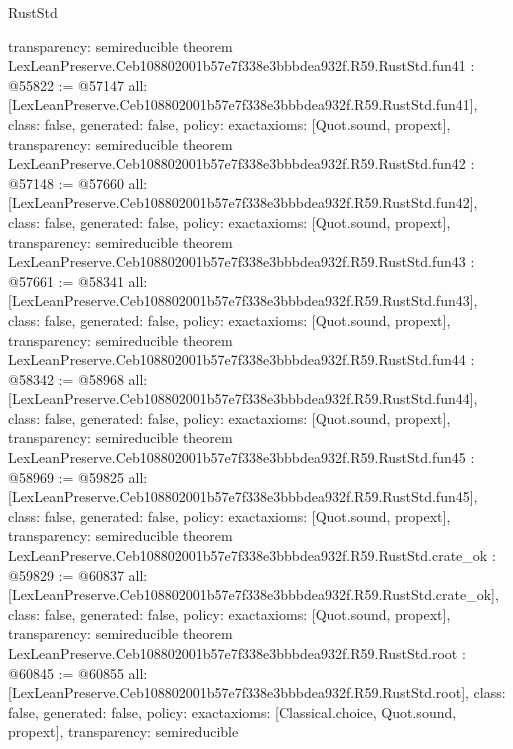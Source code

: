 \begin{lexlean}{RustStd}
\begin{coremodule}
{  transparency: semireducible
}
theorem LexLeanPreserve.Ceb108802001b57e7f338e3bbbdea932f.R59.RustStd.fun41 : @55822 := @57147 {
  all: [LexLeanPreserve.Ceb108802001b57e7f338e3bbbdea932f.R59.RustStd.fun41],
  class: false,
  generated: false,
  policy: exact{axioms: [Quot.sound, propext]},
  transparency: semireducible
}
theorem LexLeanPreserve.Ceb108802001b57e7f338e3bbbdea932f.R59.RustStd.fun42 : @57148 := @57660 {
  all: [LexLeanPreserve.Ceb108802001b57e7f338e3bbbdea932f.R59.RustStd.fun42],
  class: false,
  generated: false,
  policy: exact{axioms: [Quot.sound, propext]},
  transparency: semireducible
}
theorem LexLeanPreserve.Ceb108802001b57e7f338e3bbbdea932f.R59.RustStd.fun43 : @57661 := @58341 {
  all: [LexLeanPreserve.Ceb108802001b57e7f338e3bbbdea932f.R59.RustStd.fun43],
  class: false,
  generated: false,
  policy: exact{axioms: [Quot.sound, propext]},
  transparency: semireducible
}
theorem LexLeanPreserve.Ceb108802001b57e7f338e3bbbdea932f.R59.RustStd.fun44 : @58342 := @58968 {
  all: [LexLeanPreserve.Ceb108802001b57e7f338e3bbbdea932f.R59.RustStd.fun44],
  class: false,
  generated: false,
  policy: exact{axioms: [Quot.sound, propext]},
  transparency: semireducible
}
theorem LexLeanPreserve.Ceb108802001b57e7f338e3bbbdea932f.R59.RustStd.fun45 : @58969 := @59825 {
  all: [LexLeanPreserve.Ceb108802001b57e7f338e3bbbdea932f.R59.RustStd.fun45],
  class: false,
  generated: false,
  policy: exact{axioms: [Quot.sound, propext]},
  transparency: semireducible
}
theorem LexLeanPreserve.Ceb108802001b57e7f338e3bbbdea932f.R59.RustStd.crate_ok : @59829 := @60837 {
  all: [LexLeanPreserve.Ceb108802001b57e7f338e3bbbdea932f.R59.RustStd.crate_ok],
  class: false,
  generated: false,
  policy: exact{axioms: [Quot.sound, propext]},
  transparency: semireducible
}
theorem LexLeanPreserve.Ceb108802001b57e7f338e3bbbdea932f.R59.RustStd.root : @60845 := @60855 {
  all: [LexLeanPreserve.Ceb108802001b57e7f338e3bbbdea932f.R59.RustStd.root],
  class: false,
  generated: false,
  policy: exact{axioms: [Classical.choice, Quot.sound, propext]},
  transparency: semireducible
}


\end{coremodule}
\end{lexlean}
